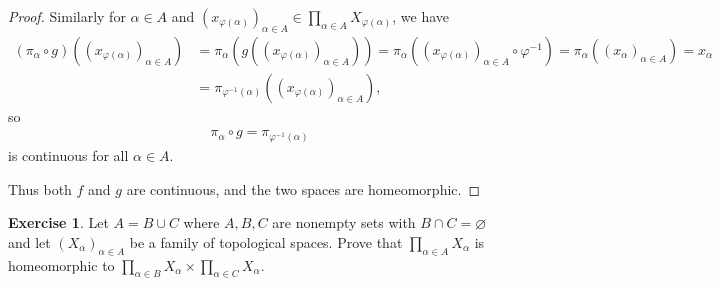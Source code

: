 \documentclass[12pt]{extarticle}
\newcommand{\<}{\langle}
\renewcommand{\>}{\rangle}
\renewcommand{\emptyset}{\varnothing}
\theoremstyle{definition}
\newtheorem{exercise}{Exercise}
\begin{document}
\begin{proof}
  Similarly for $\alpha \in A$ and $(x_{\varphi(\alpha)})_{\alpha \in A} \in \prod\limits_{\alpha \in A} X_{\varphi(\alpha)}$, we have
  \begin{align*}
    (\pi_{\alpha}\circ g)((x_{\varphi(\alpha)})_{\alpha \in A}) &= \pi_{\alpha}(g((x_{\varphi(\alpha)})_{\alpha \in A})) = \pi_{\alpha}((x_{\varphi(\alpha)})_{\alpha \in A} \circ \varphi^{-1}) = \pi_{\alpha}((x_{\alpha})_{\alpha \in A}) = x_{\alpha} \\
    &= \pi_{\varphi^{-1}(\alpha)}((x_{\varphi(\alpha)})_{\alpha \in A}),
  \end{align*}
  so
  \begin{align*}
    \pi_{\alpha}\circ g = \pi_{\varphi^{-1}(\alpha)}
  \end{align*}
  is continuous for all $\alpha \in A$.
  
  Thus both $f$ and $g$ are continuous, and the two spaces are homeomorphic. 
\end{proof}
\begin{exercise}
  Let $A = B \cup C$ where $A,B,C$ are nonempty sets with $B \cap C = \emptyset$ and let $(X_{\alpha})_{\alpha \in A}$ be a family of topological spaces.
  Prove that $\prod\limits_{\alpha \in A} X_{\alpha}$ is homeomorphic to $ \prod\limits_{\alpha \in B} X_{\alpha} \times \prod\limits_{\alpha \in C} X_{\alpha}$.
\end{exercise}
\end{document}

